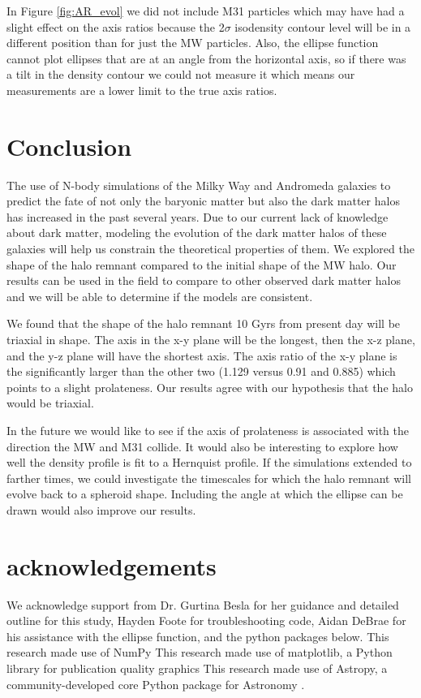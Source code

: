 \documentclass[linenumbers, twocolumn]{aastex631}
\begin{document}
In Figure \ref{fig:AR_evol} we did not include M31 particles which may have had a slight effect on the axis ratios because the 2$\sigma$ isodensity contour level will be in a different position than for just the MW particles. 
Also, the ellipse function cannot plot ellipses that are at an angle from the horizontal axis, so if there was a tilt in the density contour we could not measure it which means our measurements are a lower limit to the true axis ratios.

\section{Conclusion}
The use of N-body simulations of the Milky Way and Andromeda galaxies  to predict the fate of not only the baryonic matter but also the dark matter halos has increased in the past several years. 
Due to our current lack of knowledge about dark matter, modeling the evolution of the dark matter halos of these galaxies will help us constrain the theoretical properties of them.
We explored the shape of the halo remnant compared to the initial shape of the MW halo.
Our results can be used in the field to compare to other observed dark matter halos and we will be able to determine if the models are consistent.

We found that the shape of the halo remnant 10 Gyrs from present day will be triaxial in shape. 
The axis in the x-y plane will be the longest, then the x-z plane, and the y-z plane will have the shortest axis. 
The axis ratio of the x-y plane is the significantly larger than the other two (1.129 versus 0.91 and 0.885) which points to a slight prolateness.
Our results agree with our hypothesis that the halo would be triaxial. 


In the future we would like to see if the axis of prolateness is associated with the direction the MW and M31 collide. 
It would also be interesting to explore how well the density profile is fit to a Hernquist profile.
If the simulations extended to farther times, we could investigate the timescales for which the halo remnant will evolve back to a spheroid shape. Including the angle at which the ellipse can be drawn would also improve our results.



\section{acknowledgements}
We acknowledge support from Dr. Gurtina Besla for her guidance and detailed outline for this study, Hayden Foote for troubleshooting code, Aidan DeBrae for his assistance with the ellipse function, and the python packages below.
This research made use of NumPy \citep{harris2020array} This research made use of matplotlib, a Python library for publication quality graphics \citep{Hunter:2007} This research made use of Astropy, a community-developed core Python package for Astronomy \citep{2018AJ....156..123A, 2013A&A...558A..33A}.
\end{document}
